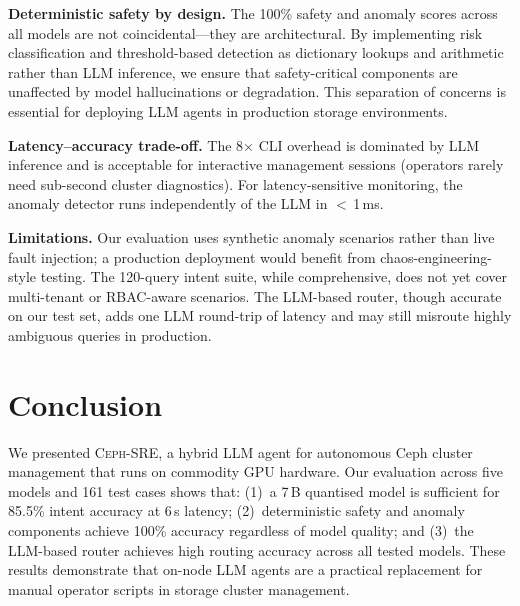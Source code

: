 \documentclass[sigplan,nonacm,10pt]{acmart}
\newcommand{\sysname}{\textsc{Ceph-SRE}\xspace}
\begin{document}
\textbf{Deterministic safety by design.}\enspace
The 100\% safety and anomaly scores across all models are not
coincidental---they are architectural.
By implementing risk classification and threshold-based detection
as dictionary lookups and arithmetic rather than LLM
inference, we ensure that safety-critical components are
unaffected by model hallucinations or degradation.
This separation of concerns is essential for deploying LLM agents
in production storage environments.

\textbf{Latency--accuracy trade-off.}\enspace
The 8$\times$ CLI overhead is dominated by LLM inference and is
acceptable for interactive management sessions (operators rarely
need sub-second cluster diagnostics).
For latency-sensitive monitoring, the anomaly detector runs
independently of the LLM in $<$\,1\,ms.

\textbf{Limitations.}\enspace
Our evaluation uses synthetic anomaly scenarios rather than live
fault injection; a production deployment would benefit from
chaos-engineering-style testing.
The 120-query intent suite, while comprehensive, does not yet cover
multi-tenant or RBAC-aware scenarios.
The LLM-based router, though accurate on our test set,
adds one LLM round-trip of latency and may still misroute
highly ambiguous queries in production.


\section{Conclusion}\label{sec:conclusion}

We presented \sysname, a hybrid LLM agent for autonomous Ceph
cluster management that runs on commodity GPU hardware.
Our evaluation across five models and 161 test cases shows that:
(1)~a 7\,B quantised model is sufficient for 85.5\% intent accuracy
at 6\,s latency;
(2)~deterministic safety and anomaly components achieve 100\%
accuracy regardless of model quality; and
(3)~the LLM-based router achieves high routing accuracy
across all tested models.
These results demonstrate that on-node LLM agents are a practical
replacement for manual operator scripts in storage cluster management.


\balance

\end{document}
